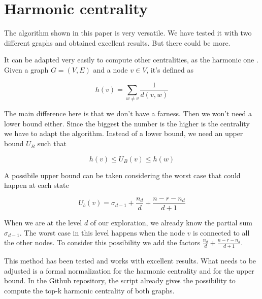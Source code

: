 \section{Harmonic centrality}

The algorithm shown in this paper is very versatile. We have tested it with two different graphs and obtained excellent results. But there could be more.

\s \nd It can be adapted very easily to compute other centralities, as the harmonic one \cite{2000}. Given a graph $G = (V,E)$ and a node $v \in V$, it's defined as

\begin{equation}
    h(v) = \sum_{w \neq v} \frac{1}{d(v,w)}
\end{equation}

\nd The main difference here is that we don't have a farness. Then we won't need a lower bound either. Since the biggest the number is the higher is the centrality we have to adapt the algorithm. Instead of a lower bound, we need an upper bound $U_B$ such that

\begin{equation}
    h(v) \leq U_B (v) \leq h(w)
\end{equation}

\nd A possibile upper bound can be taken considering the worst case that could happen at each state

\begin{equation}
    U_b (v) = \sigma_{d-1} + \frac{n_d}{d} + \frac{n - r - n_d}{d+1}
\end{equation}

\nd When we are at the level $d$ of our exploration, we already know the partial sum $\sigma_{d-1}$. The worst case in this level happens when the node $v$ is connected to all the other nodes. To consider this possibility we add the factors $\frac{n_d}{d} + \frac{n - r - n_d}{d+1}$.

\s \nd This method has been tested and works with excellent results. What needs to be adjusted is a formal normalization for the harmonic centrality and for the upper bound. In the Github repository, the script already gives the possibility to compute the top-k harmonic centrality of both graphs.
